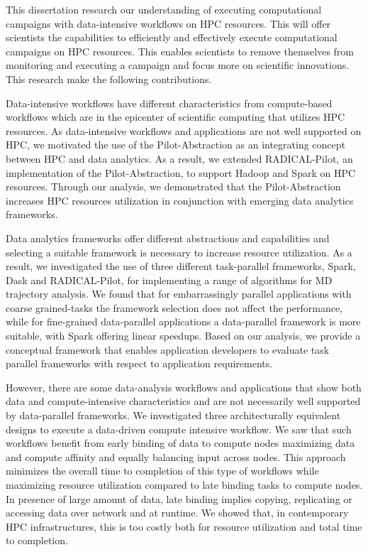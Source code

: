 \label{ch:conclusions}
This dissertation research our understanding of executing computational 
campaigns with data-intensive workflows on HPC resources. This will offer 
scientists the capabilities to efficiently and effectively execute 
computational campaigns on HPC resources. This enables scientists to remove 
themselves from monitoring and executing a campaign and focus more on 
scientific innovations. This research make the following contributions.

Data-intensive workflows have different characteristics from compute-based 
workflows which are in the epicenter of scientific computing that utilizes HPC 
resources. As data-intensive workflows and applications are not well supported 
on HPC, we motivated the use of the Pilot-Abstraction as an integrating 
concept between HPC and data analytics. As a result, we extended 
RADICAL-Pilot, an implementation of the Pilot-Abstraction, to support Hadoop 
and Spark on HPC resources. Through our analysis, we demonstrated that the 
Pilot-Abstraction increases HPC resources utilization in conjunction with 
emerging data analytics frameworks.

Data analytics frameworks offer different abstractions and capabilities and 
selecting a suitable framework is necessary to increase resource utilization.
As a result, we investigated the use of three different task-parallel 
frameworks, Spark, Dask and RADICAL-Pilot, for implementing a range of 
algorithms for MD trajectory analysis. We found that for embarrassingly 
parallel applications with coarse grained-tasks the framework selection does 
not affect the performance, while for fine-grained data-parallel applications 
a data-parallel framework is more suitable, with Spark offering linear 
speedups. Based on our analysis, we provide a conceptual framework that 
enables application developers to evaluate task parallel frameworks with 
respect to application requirements.

However, there are some data-analysis workflows and applications that show 
both data and compute-intensive characteristics and are not necessarily well 
supported by data-parallel frameworks. We investigated three architecturally 
equivalent designs to execute a data-driven compute intensive workflow. We saw 
that such workflows benefit from early binding of data to compute nodes 
maximizing data and compute affinity and equally balancing input across nodes.
This approach minimizes the overall time to completion of this type of 
workflows while maximizing resource utilization compared to late binding tasks 
to compute nodes. In presence of large amount of data, late binding implies 
copying, replicating or accessing data over network and at runtime. We showed 
that, in contemporary HPC infrastructures, this is too costly both for 
resource utilization and total time to completion.

